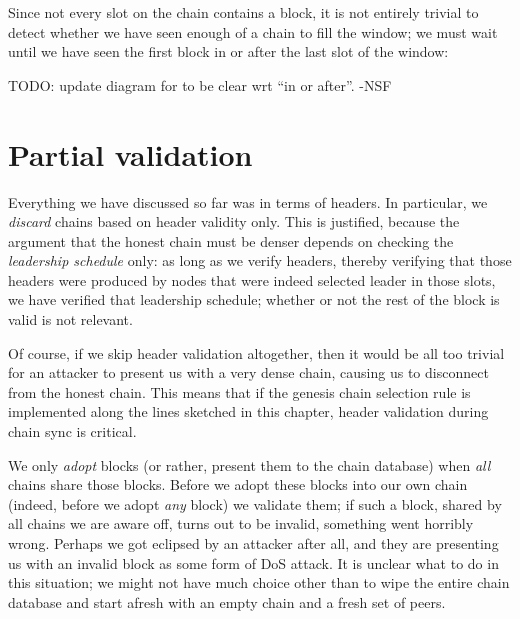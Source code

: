 Since not every slot on the chain contains a block, it is not entirely trivial
to detect whether we have seen enough of a chain to fill the window; we must
wait until we have seen the first block in or after the last slot of the window:
%
\begin{center}
\end{center}

 TODO: update diagram for to be clear wrt ``in or after''. -NSF

\section{Partial validation}

Everything we have discussed so far was in terms of headers. In particular,
we \emph{discard} chains based on header validity only. This is justified,
because the argument that the honest chain must be denser depends on checking
the \emph{leadership schedule} only: as long as we verify headers, thereby
verifying that those headers were produced by nodes that were indeed selected
leader in those slots, we have verified that leadership schedule; whether or
not the rest of the block is valid is not relevant.

Of course, if we skip header validation altogether, then it would be all too
trivial for an attacker to present us with a very dense chain, causing us to
disconnect from the honest chain. This means that if  the genesis chain
selection rule is implemented along the lines sketched in this chapter, header
validation during chain sync is critical.

We only \emph{adopt} blocks (or rather, present them to the chain database) when
\emph{all} chains share those blocks. Before we adopt these blocks into our own
chain (indeed, before we adopt \emph{any} block) we validate them; if such a
block, shared by all chains we are aware off, turns out to be invalid, something
went horribly wrong. Perhaps we got eclipsed by an attacker after all, and they
are presenting us with an invalid block as some form of DoS attack. It is
unclear what to do in this situation; we might not have much choice other than
to wipe the entire chain database and start afresh with an empty chain and a fresh set of peers.

